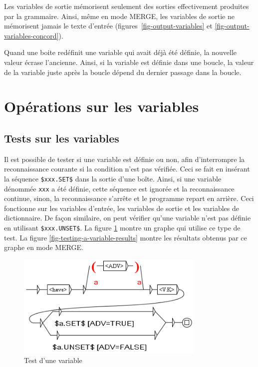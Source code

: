 \bigskip
\noindent Les variables de sortie mémorisent seulement des sorties
effectivement produites par la grammaire. Ainsi, même en mode MERGE, les
variables de sortie ne mémorisent jamais le texte d'entrée
(figures~\ref{fig-output-variables} et \ref{fig-output-variables-concord}).

\bigskip
\noindent Quand une boite redéfinit une variable qui avait déjà été définie,
 la nouvelle valeur écrase l'ancienne.
Ainsi, si la variable est définie dans une boucle, la valeur de la variable juste après
la boucle dépend du dernier passage dans la boucle.


\section{Opérations sur les variables}
\label{section-ops-on-variables}
\subsection{Tests sur les variables}

\noindent Il est possible de tester si une variable est définie ou non, afin d'interrompre la
reconnaissance courante si la condition n'est pas vérifiée. Ceci se fait en insérant la  séquence
\verb+$xxx.SET$+ dans la sortie d'une boîte. Ainsi, si une variable dénommée \verb+xxx+ a été définie,
cette séquence est ignorée et la reconnaissance continue, sinon, la reconnaissance s'arrête
et le programme repart en arrière. Ceci fonctionne sur les variables d'entrée, les variables de
sortie et les variables de dictionnaire. De façon similaire, on peut vérifier qu'une variable n'est
pas définie en utilisant \verb+$xxx.UNSET$+. La figure \ref{fig-testing-a-variable} montre un graphe
qui utilise ce type de test. La figure \ref{fig-testing-a-variable-results} montre les résultats obtenus par ce graphe en mode MERGE.

\begin{figure}[!ht]
\begin{center}
\includegraphics[width=9cm]{resources/img/fig6-29b.png}
\caption{Test d'une variable\label{fig-testing-a-variable}}
\end{center}
\end{figure}


